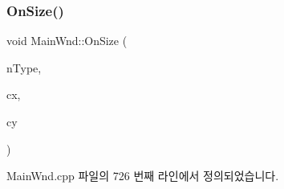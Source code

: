 \subsubsection{\texorpdfstring{On\+Size()}{OnSize()}}
{\footnotesize\ttfamily void Main\+Wnd\+::\+On\+Size (\begin{DoxyParamCaption}\item[{U\+I\+NT}]{n\+Type,  }\item[{\mbox{\hyperlink{_util_8cpp_a0ef32aa8672df19503a49fab2d0c8071}{int}}}]{cx,  }\item[{\mbox{\hyperlink{_util_8cpp_a0ef32aa8672df19503a49fab2d0c8071}{int}}}]{cy }\end{DoxyParamCaption})\hspace{0.3cm}{\ttfamily [protected]}}



Main\+Wnd.\+cpp 파일의 726 번째 라인에서 정의되었습니다.


